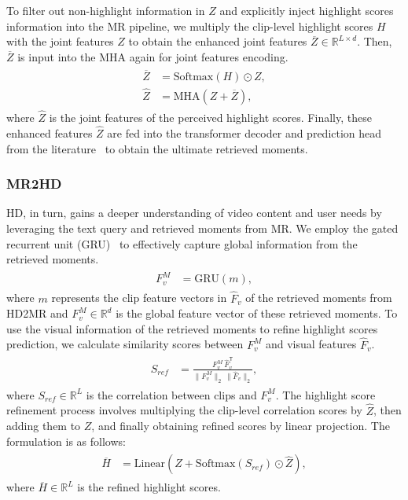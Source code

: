 To filter out non-highlight information in $Z$ and explicitly inject highlight scores information into the MR pipeline, we multiply the clip-level highlight scores $H$ with the joint features $Z$  to obtain the enhanced joint features $\overline{Z} \in \mathbb{R}^{L \times d}$.  Then, $\overline{Z}$ is input into the MHA again for joint features encoding.
\begin{align}
\begin{aligned}
    \overline{Z} &= \text{Softmax}(H) \odot Z,\\
    \widehat{Z} &= \text{MHA}\left(Z + \overline{Z}\right),
\end{aligned}
\end{align}
where $\widehat{Z}$ is the joint features of the perceived highlight scores.
Finally, these enhanced features $\widehat{Z}$ are fed into the transformer decoder and prediction head from the literature~\cite{DBLP:conf/iclr/LiuLZYQSZZ22} to obtain the ultimate retrieved moments.

\subsubsection{MR2HD}
HD, in turn, gains a deeper understanding of video content and user needs by leveraging the text query and retrieved moments from MR. We employ the gated recurrent unit (GRU)~\cite{chung2014empirical} to effectively capture global information from the retrieved moments.
\begin{align}
\begin{aligned}
    F^M_v &= \text{GRU}(m),
\end{aligned}
\end{align}
 where $m$ represents the clip feature vectors in $\widehat{F}_v$ of the retrieved moments from HD2MR and $F^M_v \in \mathbb{R}^d$ is the global feature vector of these retrieved moments. To use the visual information of the retrieved moments to refine highlight scores prediction, we calculate similarity scores between $F^M_v$ and visual features $\widehat{F}_v$.
\begin{align}
\begin{aligned}
    S_{ref} &= \frac{F^M_v \, \widehat{F}_v^\mathsf{T}}{\|F^M_v\|_2 \, \|\widehat{F}_v\|_2},
\end{aligned}
\end{align}
 where $S_{ref}\in\mathbb{R}^L$ is the correlation between clips and $F^M_v$.
 The highlight score refinement process involves multiplying the clip-level correlation scores by $\widehat{Z}$, then adding them to $Z$, and finally obtaining refined scores by linear projection. The formulation is as follows:
 \begin{align}
    \begin{aligned}\overline{H}&=\text{Linear}(Z+\text{Softmax}(S_{ref})\odot \widehat{Z}),\end{aligned}
 \end{align}
where $\overline{H} \in\mathbb{R}^L$ is the refined highlight scores.


